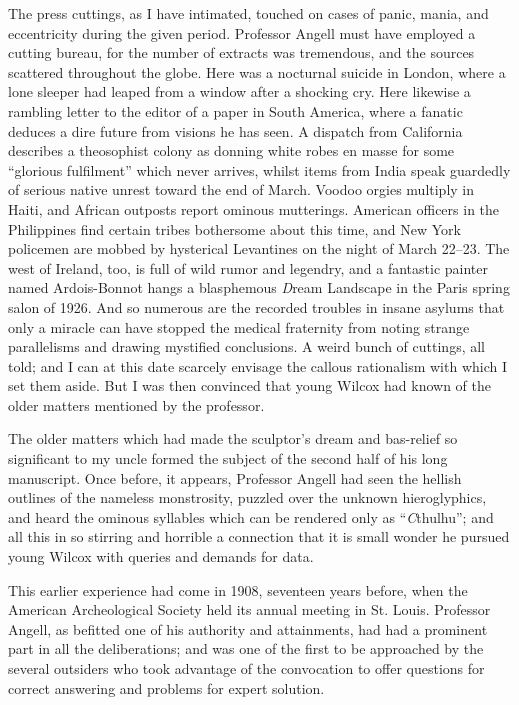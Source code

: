 The press cuttings, as I have intimated, touched on cases of panic, mania, and eccentricity during the given period. Professor Angell must have employed a cutting bureau, for the number of extracts was tremendous, and the sources scattered throughout the globe. Here was a nocturnal suicide in London, where a lone sleeper had leaped from a window after a shocking cry. Here likewise a rambling letter to the editor of a paper in South America, where a fanatic deduces a dire future from visions he has seen. A dispatch from California describes a theosophist colony as donning white robes en masse for some “glorious fulfilment” which never arrives, whilst items from India speak guardedly of serious native unrest toward the end of March. Voodoo orgies multiply in Haiti, and African outposts report ominous mutterings. American officers in the Philippines find certain tribes bothersome about this time, and New York policemen are mobbed by hysterical Levantines on the night of March 22⁠–⁠23. The west of Ireland, too, is full of wild rumor and legendry, and a fantastic painter named Ardois-Bonnot hangs a blasphemous {\emph Dream Landscape} in the Paris spring salon of 1926. And so numerous are the recorded troubles in insane asylums that only a miracle can have stopped the medical fraternity from noting strange parallelisms and drawing mystified conclusions. A weird bunch of cuttings, all told; and I can at this date scarcely envisage the callous rationalism with which I set them aside. But I was then convinced that young Wilcox had known of the older matters mentioned by the professor.
\endchapter


The older matters which had made the sculptor’s dream and bas-relief so significant to my uncle formed the subject of the second half of his long manuscript. Once before, it appears, Professor Angell had seen the hellish outlines of the nameless monstrosity, puzzled over the unknown hieroglyphics, and heard the ominous syllables which can be rendered only as “{\emph Cthulhu}”; and all this in so stirring and horrible a connection that it is small wonder he pursued young Wilcox with queries and demands for data.

This earlier experience had come in 1908, seventeen years before, when the American Archeological Society held its annual meeting in St. Louis. Professor Angell, as befitted one of his authority and attainments, had had a prominent part in all the deliberations; and was one of the first to be approached by the several outsiders who took advantage of the convocation to offer questions for correct answering and problems for expert solution.

